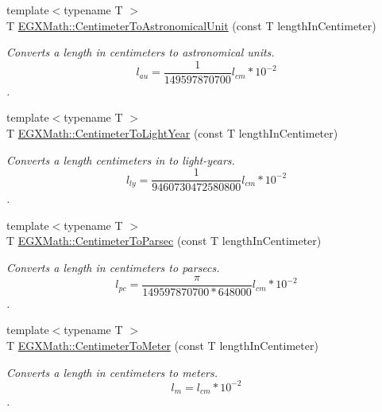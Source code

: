 \begin{DoxyCompactItemize}
\item 
{\footnotesize template$<$typename T $>$ }\\T \mbox{\hyperlink{group___e_g_x_math-_conversions-_length_conversions-_s_i-_centimeter-_astronomical_gaa8152adbb5be9ad80f2495646bbf316d}{E\+G\+X\+Math\+::\+Centimeter\+To\+Astronomical\+Unit}} (const T length\+In\+Centimeter)
\begin{DoxyCompactList}\small\item\em Converts a length in centimeters to astronomical units. \[ l_{au}= \frac{1}{149597870700} l_{cm} * 10^{-2} \]. \end{DoxyCompactList}\item 
{\footnotesize template$<$typename T $>$ }\\T \mbox{\hyperlink{group___e_g_x_math-_conversions-_length_conversions-_s_i-_centimeter-_astronomical_ga99b5eb487ffbb3d89497999b562ea77e}{E\+G\+X\+Math\+::\+Centimeter\+To\+Light\+Year}} (const T length\+In\+Centimeter)
\begin{DoxyCompactList}\small\item\em Converts a length centimeters in to light-\/years. \[ l_{ly}= \frac{1}{9460730472580800} l_{cm} * 10^{-2} \]. \end{DoxyCompactList}\item 
{\footnotesize template$<$typename T $>$ }\\T \mbox{\hyperlink{group___e_g_x_math-_conversions-_length_conversions-_s_i-_centimeter-_astronomical_ga9e28cd6f9d5da2330cd5bf17af20cc8f}{E\+G\+X\+Math\+::\+Centimeter\+To\+Parsec}} (const T length\+In\+Centimeter)
\begin{DoxyCompactList}\small\item\em Converts a length in centimeters to parsecs. \[ l_{pc}=\frac{\pi}{149597870700 * 648000} l_{cm} * 10^{-2} \]. \end{DoxyCompactList}\item 
{\footnotesize template$<$typename T $>$ }\\T \mbox{\hyperlink{group___e_g_x_math-_conversions-_length_conversions-_s_i-_centimeter-_s_i_gaebbc38cdc9fa18257e8cf4a0bbbb117a}{E\+G\+X\+Math\+::\+Centimeter\+To\+Meter}} (const T length\+In\+Centimeter)
\begin{DoxyCompactList}\small\item\em Converts a length in centimeters to meters. \[ l_{m}=l_{cm} * 10^{-2} \]. \end{DoxyCompactList}\item 

\end{DoxyCompactItemize}
